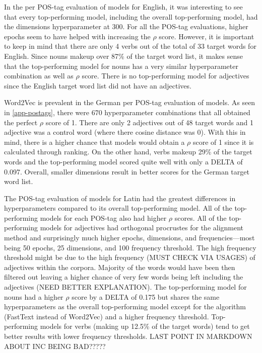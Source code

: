 In the per POS-tag evaluation of models for English, it was interesting to see that every top-performing model, including the overall top-performing model, had the dimensions hyperparameter at 300. For all the POS-tag evaluations, higher epochs seem to have helped with increasing the $\rho$ score. However, it is important to keep in mind that there are only 4 verbs out of the total of 33 target words for English. Since nouns makeup over 87\% of the target word list, it makes sense that the top-performing model for nouns has a very similar hyperparameter combination as well as $\rho$ score. There is no top-performing model for adjectives since the English target word list did not have an adjectives. 

Word2Vec is prevalent in the German per POS-tag evaluation of models. As seen in \autoref{app-postags}, there were 670 hyperparameter combinations that all obtained the perfect $\rho$ score of 1. There are only 2 adjectives out of 48 target words and 1 adjective was a control word (where there cosine distance was 0). With this in mind, there is a higher chance that models would obtain a $\rho$ score of 1 since it is calculated through ranking. On the other hand, verbs makeup 29\% of the target words and the top-performing model scored quite well with only a DELTA of 0.097. Overall, smaller dimensions result in better scores for the German target word list. 

The POS-tag evaluation of models for Latin had the greatest differences in hyperparameters compared to its overall top-performing model. All of the top-performing models for each POS-tag also had higher $\rho$ scores. All of the top-performing models for adjectives had orthogonal procrustes for the alignment method and surprisingly much higher epochs, dimensions, and frequencies—most being 50 epochs, 25 dimensions, and 100 frequency threshold. The high frequency threshold might be due to the high frequency (MUST CHECK VIA USAGES) of adjectives within the corpora. Majority of the words would have been then filtered out leaving a higher chance of very few words being left including the adjectives (NEED BETTER EXPLANATION). The top-performing model for nouns had a higher $\rho$ score by a DELTA of 0.175 but shares the same hyperparameters as the overall top-performing model except for the algorithm (FastText instead of Word2Vec) and a higher frequency threshold. Top-performing models for verbs (making up 12.5\% of the target words) tend to get better results with lower frequency thresholds. LAST POINT IN MARKDOWN ABOUT INC BEING BAD?????


